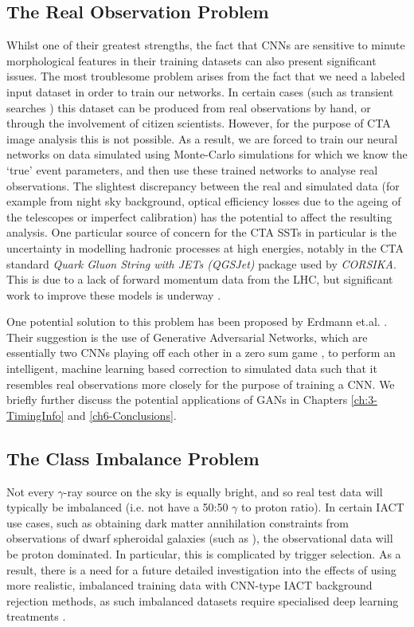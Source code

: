 \subsection{The Real Observation Problem}
Whilst one of their greatest strengths, the fact that CNNs are sensitive to minute morphological features in their training datasets can also present significant issues. The most troublesome problem arises from the fact that we need a labeled input dataset in order to train our networks. In certain cases (such as transient searches \cite{SNH}) this dataset can be produced from real observations by hand, or through the involvement of citizen scientists. However, for the purpose of CTA image analysis this is not possible. As a result, we are forced to train our neural networks on data simulated using Monte-Carlo simulations for which we know the `true' event parameters, and then use these trained networks to analyse real observations. The slightest discrepancy between the real and simulated data (for example from night sky background, optical efficiency losses due to the ageing of the telescopes or imperfect calibration) has the potential to affect the resulting analysis. One particular source of concern for the CTA SSTs in particular is the uncertainty in modelling hadronic processes at high energies, notably in the CTA standard \textit{Quark Gluon String with JETs (QGSJet)} package used by \textit{CORSIKA}. This is due to a lack of forward momentum data from the LHC, but significant work to improve these models is  underway \cite{hadronmodel}.

One potential solution to this problem has been proposed by Erdmann et.al. \cite{ErdmannAuger}. Their suggestion is the use of Generative Adversarial Networks, which are essentially two CNNs playing off each other in a zero sum game \cite{goodfellow2016deep}, to perform an intelligent, machine learning based correction to simulated data such that it resembles real observations more closely for the purpose of training a CNN. We briefly further discuss the potential applications of GANs in Chapters \ref{ch:3-TimingInfo} and \ref{ch6-Conclusions}.

\subsection{The Class Imbalance Problem}

Not every $\gamma$-ray source on the sky is equally bright, and so real test data will typically be imbalanced (i.e. not have a 50:50 $\gamma$ to proton ratio). In certain IACT use cases, such as obtaining dark matter annihilation constraints from observations of dwarf spheroidal galaxies (such as \cite{gloryduck}), the observational data will be proton dominated. In particular, this is complicated by trigger selection. As a result, there is a need for a future detailed investigation into the effects of using more realistic, imbalanced training data with CNN-type IACT background rejection methods, as such imbalanced datasets require specialised deep learning treatments \cite{imbalance}.

